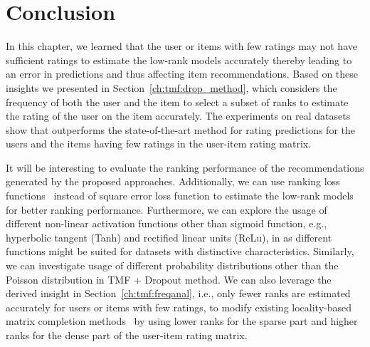 \section{Conclusion} 
\label{ch:tmf:conclusion}

In this chapter, we learned that the user or items with few ratings may not have 
sufficient ratings to estimate the low-rank models accurately thereby
leading to an error in predictions and thus affecting item recommendations.
Based on these insights we presented \TMF in Section~\ref{ch:tmf:drop_method}, which considers the frequency of
both the user and the item to select a subset of ranks to estimate
the rating of the user on the item accurately. 
The experiments on real datasets show that \TMF outperforms the
state-of-the-art \MF method
for rating predictions for the users and the items having few ratings in the
user-item rating matrix.


It will be interesting to evaluate the ranking performance of
the recommendations generated by the proposed approaches. Additionally, we can
use ranking loss functions~\cite{shi2012climf,rendle2009bpr} instead of square error loss function to estimate
the low-rank models for better ranking performance.
Furthermore, we can explore the usage of different non-linear activation
functions other than sigmoid function, e.g.,  hyperbolic tangent (Tanh) and
rectified linear units (ReLu), in \TMF as different functions might be suited for
datasets with distinctive characteristics. Similarly, we can investigate usage
of different probability distributions other than the Poisson distribution in TMF + Dropout
method. 
We can also leverage the derived insight in Section~\ref{ch:tmf:freqanal}, i.e., only fewer ranks
are estimated accurately for users or items with few ratings,  to modify
existing locality-based  matrix completion methods~\cite{lee2013local,
lee2014local,chen2015wemarec} by using lower ranks for
the sparse part and higher ranks for the dense part of the user-item rating
matrix.

